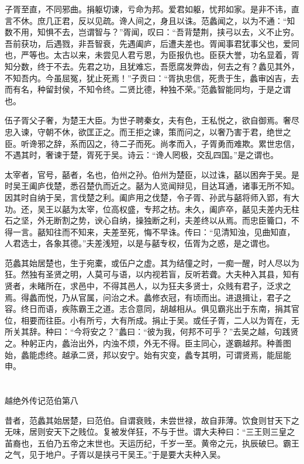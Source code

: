 \documentclass[12pt,UTF8]{ctexbook}
\begin{document}
子胥至直，不同邪曲。捐躯切谏，亏命为邦。爱君如躯，忧邦如家。是非不讳，直言不休。庶几正君，反以见疏。谗人间之，身且以诛。范蠡闻之，以为不通：“知数不用，知惧不去，岂谓智与？”胥闻，叹曰：“吾背楚荆，挟弓以去，义不止穷。吾前获功，后遇戮，非吾智衰，先遇阖庐，后遭夫差也。胥闻事君犹事父也，爱同也，严等也。太古以来，未尝见人君亏恩，为臣报仇也。臣获大誉，功名显着，胥知分数，终于不去。先君之功，且犹难忘，吾愿腐发弊齿，何去之有？蠡见其外，不知吾内。今虽屈冤，犹止死焉！”子贡曰：“胥执忠信，死贵于生，蠡审凶吉，去而有名，种留封侯，不知令终。二贤比德，种独不荣。”范蠡智能同均，于是之谓也。

伍子胥父子奢，为楚王大臣。为世子聘秦女，夫有色，王私悦之，欲自御焉。奢尽忠入谏，守朝不休，欲匡正之。而王拒之谏，策而问之，以奢乃害于君，绝世之臣。听谗邪之辞，系而囚之，待二子而死。尚孝而入，子胥勇而难欺。累世忠信，不遇其时，奢谏于楚，胥死于吴。诗云：“谗人罔极，交乱四国。”是之谓也。

太宰者，官号，嚭者，名也，伯州之孙。伯州为楚臣，以过诛，嚭以困奔于吴。是时吴王阖庐伐楚，悉召楚仇而近之。嚭为人览闻辩见，目达耳通，诸事无所不知。因其时自纳于吴，言伐楚之利。阖庐用之伐楚，令子胥、孙武与嚭将师入郢，有大功。还，吴王以嚭为太宰，位高权盛，专邦之枋。未久，阖庐卒，嚭见夫差内无柱石之坚，外无断割之势，谀心自纳，操独断之利，夫差终以从焉。而忠臣籥口，不得一言。嚭知往而不知来，夫差至死，悔不早诛。传曰：“见清知浊，见曲知直，人君选士，各象其德。”夫差浅短，以是与嚭专权，伍胥为之惑，是之谓也。

范蠡其始居楚也，生于宛橐，或伍户之虚。其为结僮之时，一痴一醒，时人尽以为狂。然独有圣贤之明，人莫可与语，以内视若盲，反听若聋。大夫种入其县，知有贤者，未睹所在，求邑中，不得其邑人，以为狂夫多贤士，众贱有君子，泛求之焉。得蠡而悦，乃从官属，问治之术。蠡修衣冠，有顷而出。进退揖让，君子之容。终日而语，疾陈霸王之道。志合意同，胡越相从。俱见霸兆出于东南，捐其官位，相要而往臣。小有所亏，大有所成。捐止于吴。或任子胥，二人以为胥在，无所关其辞。种曰：“今将安之？”蠡曰：“彼为我，何邦不可乎？”去吴之越，句践贤之。种躬正内，蠡治出外，内浊不烦，外无不得。臣主同心，遂霸越邦。种善图始，蠡能虑终。越承二贤，邦以安宁。始有灾变，蠡专其明，可谓贤焉，能屈能申。

\part{}

越绝外传记范伯第八

昔者，范蠡其始居楚，曰范伯。自谓衰贱，未尝世禄，故自菲薄。饮食则甘天下之无味，居则安天下之贱位。复被发佯狂，不与于世。谓大夫种曰：“三王则三皇之苖裔也，五伯乃五帝之末世也。天运历纪，千岁一至。黄帝之元，执辰破巳。霸王之气，见于地户。子胥以是挟弓干吴王。”于是要大夫种入吴。
\end{document}
